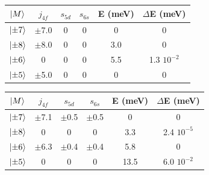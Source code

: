 \documentclass[
reprint,amsmath,amssymb,aps]{revtex4-2}
\begin{document}
\begin{table}
    \begin{tabular}{cccccc}
    \hline
    \hline
    $\ket{M}$ & $j_{4f}$ & $s_{5d}$ & $s_{6s}$ & E (meV) & $\Delta$E (meV)\\
    \hline
    $\ket{\pm 7}$ & $\pm$7.0 & 0 & 0 & 0 & 0     \\
    $\ket{\pm 8}$ & $\pm$8.0 & 0 & 0 & 3.0 & 0    \\
    $\ket{\pm 6}$ & 0 & 0 & 0 & 5.5 &   1.3 $10^{-2}$   \\
    $\ket{\pm 5}$ & $\pm$5.0 & 0 & 0 & 0 & 0      \\
    \hline
    \hline
    \end{tabular}
\end{table}

\begin{table}
    \begin{tabular}{cccccc}
    \hline
    \hline
    $\ket{M}$ & $j_{4f}$ & $s_{5d}$ & $s_{6s}$ & E (meV) & $\Delta$E (meV)\\
    \hline
    $\ket{\pm 7}$ & $\pm$7.1 & $\pm$0.5 & $\pm$0.5 & 0 & 0     \\
    $\ket{\pm 8}$ & 0 & 0 & 0 & 3.3 & 2.4 $10^{-5}$    \\
    $\ket{\pm 6}$ & $\pm$6.3 & $\pm$0.4 & $\pm$0.4 & 5.8 &   0   \\
    $\ket{\pm 5}$ & 0 & 0 & 0 & 13.5 & 6.0 $10^{-2}$       \\ 
    \hline
    \hline
    \end{tabular}
\end{table}





\end{document}
